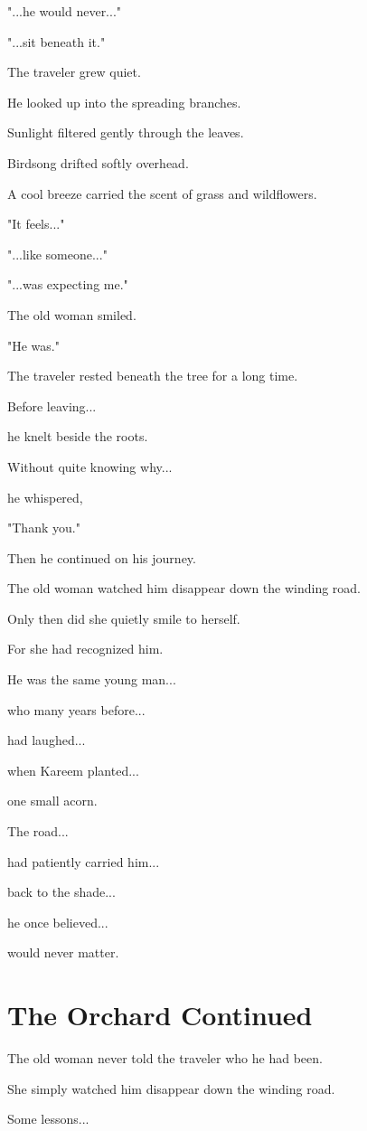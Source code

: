 \documentclass[12pt,openany]{book}
\begin{document}
"...he would never..."

"...sit beneath it."

The traveler grew quiet.

He looked up into the spreading branches.

Sunlight filtered gently through the leaves.

Birdsong drifted softly overhead.

A cool breeze carried the scent of grass and wildflowers.

"It feels..."

"...like someone..."

"...was expecting me."

The old woman smiled.

"He was."

The traveler rested beneath the tree for a long time.

Before leaving...

he knelt beside the roots.

Without quite knowing why...

he whispered,

"Thank you."

Then he continued on his journey.

The old woman watched him disappear down the winding road.

Only then did she quietly smile to herself.

For she had recognized him.

He was the same young man...

who many years before...

had laughed...

when Kareem planted...

one small acorn.

The road...

had patiently carried him...

back to the shade...

he once believed...

would never matter.
\section*{The Orchard Continued}

The old woman never told the traveler who he had been.

She simply watched him disappear down the winding road.

Some lessons...
\end{document}
